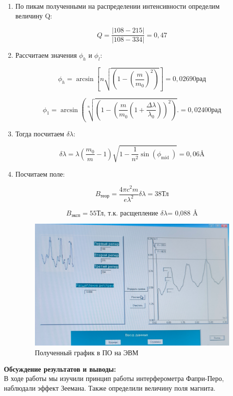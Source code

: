 \documentclass[a4paper, 12pt]{article}%
\begin{document}
	\begin{enumerate}
		\item По пикам полученными на распределении интенсивности определим величину Q:
		
		$$ Q = \frac{|108-215|}{|108-334|} = 0,47 $$
		
		\item Рассчитаем значения $\phi_h$ и $\phi_l$:
		
		$$ \phi_h=\arcsin \left[n \sqrt{\left(1-\left(\frac{m}{m_0}\right)^2\right)}\right] = 0,02690 \text{рад}$$
		
		$$ \phi_1=\arcsin \left(\sqrt[n]{\left(1-\left(\frac{m}{m_0}\left(1+\frac{\Delta \lambda}{\lambda_0}\right)\right)^2\right)} .\right. = 0,02400 \text{рад}$$ 
		
		\item Тогда посчитаем $\delta \lambda$:
		
		$$ \delta \lambda=\lambda\left(\frac{m_0}{m}-1\right) \sqrt{1-\frac{1}{n^2} \sin \left(\phi_{\text {mid }}\right)} = 0,06 \text{\AA} $$
		
		\item Посчитаем поле:
		
		$$ B_{\text{теор}} = \frac{4\pi c^2 m}{ e \lambda^2} \delta \lambda = 38 \text{Тл}$$
		
		$$ B_{\text{эксп}} = 55 \text{Тл, т.к. расщепление $\delta \lambda $= 0,088 \AA}$$
		
		
		\begin{figure}[h!]
			\centering
			\includegraphics[width=1\linewidth]{graph}
			\caption{Полученный график в ПО на ЭВМ}
		\end{figure}
		
		
		
		
	\end{enumerate}
	
	\textbf{Обсуждение результатов и выводы: }\\
	
	В ходе работы мы изучили принцип работы интерферометра Фапри-Перо, наблюдали эффект Зеемана. Также определили величину поля магнита.
	
	
	
	
	
	
	
	
\end{document}
